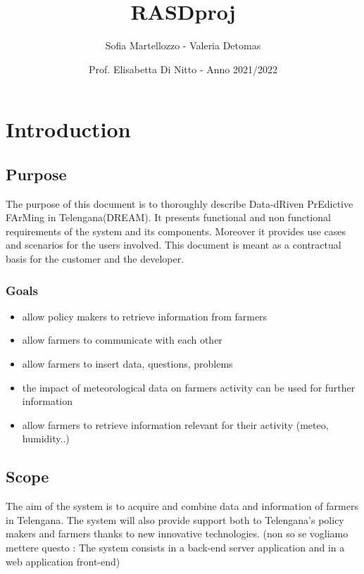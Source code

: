 \documentclass{article}
\title{RASDproj}
\date{Prof. Elisabetta Di Nitto  -  Anno 2021/2022}
\author{Sofia Martellozzo - 
      Valeria Detomas 
}
\begin{document}
\maketitle
\newpage
\renewcommand\contentsname{Contents}
\tableofcontents

\newpage

\section{Introduction}

\subsection{Purpose}
The purpose of this document is to thoroughly describe 
Data-dRiven PrEdictive FArMing in Telengana(DREAM).
It presents functional and non functional requirements of the system and its components.
Moreover it provides use cases and scenarios for the users involved.
\newline
This document is meant as a contractual basis for the customer and the developer.

\subsubsection{Goals}
\label{section:1.1.1}
\begin{itemize}
    \item  allow policy makers to retrieve information from farmers
\item allow farmers to communicate with each other
\item allow farmers to insert data, questions, problems
\item the impact of meteorological data on farmers activity can be used for further information
\item allow farmers to retrieve information relevant for their activity (meteo, humidity..)
\end{itemize}

\subsection{Scope}
The aim of the system is to acquire and combine data and information of farmers in Telengana. 
The system will also provide support both to Telengana's policy makers and farmers thanks to 
new innovative technologies.
\newline
(non so se vogliamo mettere questo : The system consists in a back-end server application and in a web application front-end)
\newline
\end{document}

